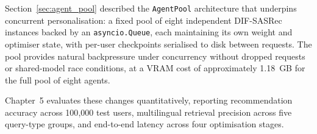 Section~\ref{sec:agent_pool} described the \texttt{AgentPool} architecture that underpins concurrent personalisation: a fixed pool of eight independent DIF-SASRec instances backed by an \texttt{asyncio.Queue}, each maintaining its own weight and optimiser state, with per-user checkpoints serialised to disk between requests.
The pool provides natural backpressure under concurrency without dropped requests or shared-model race conditions, at a VRAM cost of approximately 1.18~GB for the full pool of eight agents.

Chapter~5 evaluates these changes quantitatively, reporting recommendation accuracy across 100{,}000 test users, multilingual retrieval precision across five query-type groups, and end-to-end latency across four optimisation stages.
